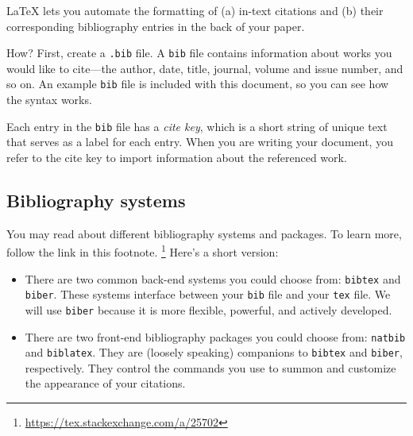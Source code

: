\documentclass[12pt
              ]{article}
\begin{document}
{\LaTeX} lets you automate the formatting of (a) in-text citations and (b) their corresponding bibliography entries in the back of your paper. 

How? First, create a \texttt{.bib} file. A \texttt{bib} file contains information about works you would like to cite---the author, date, title, journal, volume and issue number, and so on. An example \texttt{bib} file is included with this document, so you can see how the syntax works. 

Each entry in the \texttt{bib} file has a \emph{cite key}, which is a short string of unique text that serves as a label for each entry. When you are writing your document, you refer to the cite key to import information about the referenced work.

\subsection{Bibliography systems}

You may read about different bibliography systems and packages. To learn more, follow the link in this footnote.%
  \footnote{\url{https://tex.stackexchange.com/a/25702}}
Here's a short version:
\begin{itemize}
 \item There are two common back-end systems you could choose from: \texttt{bibtex} and \texttt{biber}. These systems interface between your \texttt{bib} file and your \texttt{tex} file. We will use \texttt{biber} because it is more flexible, powerful, and actively developed.
 \item There are two front-end bibliography packages you could choose from: \texttt{natbib} and \texttt{biblatex}. They are (loosely speaking) companions to \texttt{bibtex} and \texttt{biber}, respectively. They control the commands you use to summon and customize the appearance of your citations.
\end{itemize}
\end{document}

